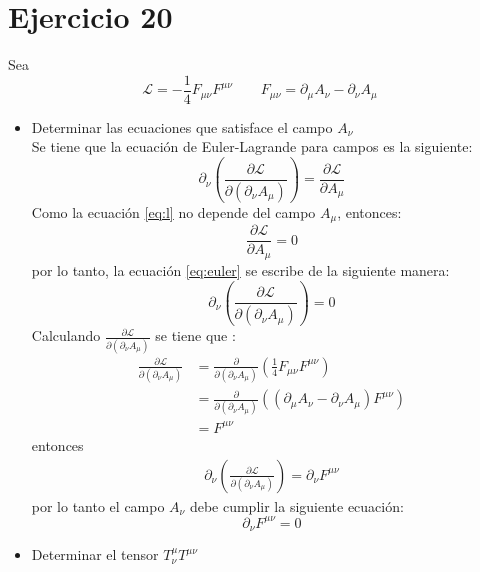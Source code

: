 \section*{Ejercicio 20}
Sea 
\begin{equation*}\label{eq:l}
    \mathcal{L } = -\frac{1}{4}F_{\mu\nu}F^{\mu\nu} \qquad F_{\mu \nu}= \partial_\mu A_\nu - \partial_\nu A_\mu
\end{equation*}
\begin{itemize}
    \item Determinar las ecuaciones que satisface el campo $A_\nu$\\
    Se tiene que la ecuación de Euler-Lagrande para campos es la siguiente:
\begin{equation*}
  \partial_\nu \left( \frac{\partial \mathcal{L}}{\partial (\partial_\nu A_\mu)}\right) = \frac{\partial \mathcal{L}}{\partial A_\mu}
  \label{eq:euler}
\end{equation*}
Como la ecuación \ref{eq:l} no depende del campo $A_\mu$, entonces:
\begin{equation*}
  \frac{\partial \mathcal{L}}{\partial A_\mu} = 0
\end{equation*}
por lo tanto, la ecuación \ref{eq:euler} se escribe de la siguiente manera:
\begin{equation*}
  \partial_\nu \left( \frac{\partial \mathcal{L}}{\partial (\partial_\nu A_\mu)}\right) = 0
  \label{eq:euler2}
\end{equation*}
Calculando $ \frac{\partial \mathcal{L}}{\partial (\partial_\nu A_\mu)}$ se tiene que :
  \begin{align*}
    \frac{\partial \mathcal{L}}{\partial (\partial_\nu A_\mu)} &=   \frac{\partial }{\partial (\partial_\nu A_\mu)} \left(\frac{1}{4}F_{\mu \nu} F^{\mu \nu} \right)\\
    &= \frac{\partial }{\partial (\partial_\nu A_\mu)}(\left(\partial_\mu A_\nu - \partial_\nu A_\mu\right) F^{\mu \nu})\\
    & = F^{\mu \nu }
  \end{align*}
  entonces
  \begin{align*}
      \partial_\nu \left( \frac{\partial \mathcal{L}}{\partial (\partial_\nu A_\mu)}\right)=
      \partial_\nu F^{\mu \nu} 
  \end{align*}
  por lo tanto el campo $A_\nu$ debe cumplir la siguiente ecuación:
  \begin{equation*}
    \partial_\nu F^{\mu \nu} =0
  \end{equation*} 
    \item Determinar el tensor $T^\mu_\nu T^{\mu\nu}$\\

\end{itemize}
